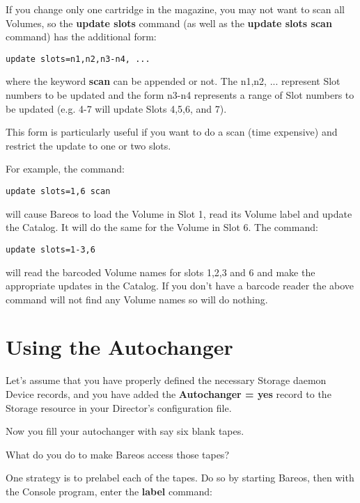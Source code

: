 If you change only one cartridge in the magazine, you may not want to scan all
Volumes, so the {\bf update slots} command (as well as the {\bf update slots
scan} command) has the additional form:

\footnotesize
\begin{verbatim}
update slots=n1,n2,n3-n4, ...
\end{verbatim}
\normalsize

where the keyword {\bf scan} can be appended or not. The n1,n2, ... represent
Slot numbers to be updated and the form n3-n4 represents a range of Slot
numbers to be updated (e.g. 4-7 will update Slots 4,5,6, and 7).

This form is particularly useful if you want to do a scan (time expensive) and
restrict the update to one or two slots.

For example, the command:

\footnotesize
\begin{verbatim}
update slots=1,6 scan
\end{verbatim}
\normalsize

will cause Bareos to load the Volume in Slot 1, read its Volume label and
update the Catalog. It will do the same for the Volume in Slot 6. The command:


\footnotesize
\begin{verbatim}
update slots=1-3,6
\end{verbatim}
\normalsize

will read the barcoded Volume names for slots 1,2,3 and 6 and make the
appropriate updates in the Catalog. If you don't have a barcode reader the above command will
not find any Volume names so will do nothing.


\section{Using the Autochanger}
\label{using}

Let's assume that you have properly defined the necessary Storage daemon
Device records, and you have added the {\bf Autochanger = yes} record to the
Storage resource in your Director's configuration file.

Now you fill your autochanger with say six blank tapes.

What do you do to make Bareos access those tapes?

One strategy is to prelabel each of the tapes. Do so by starting Bareos, then
with the Console program, enter the {\bf label} command:

